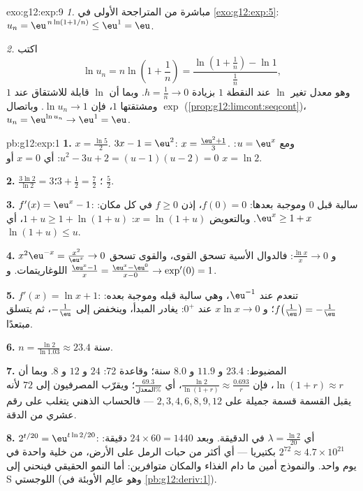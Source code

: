 \begin{solution}{exo:g12:exp:9}
\emph{1.} مباشرة من المتراجحة الأولى في \cref{exo:g12:exp:5}:
$u_n = \eu^{\,n\ln(1+1/n)} \leq \eu^1 = \eu$.

\emph{2.} اكتب
\[
\ln u_n = n \ln\!\left(1 + \frac1n\right)
= \frac{\ln\!\left(1 + \frac1n\right) - \ln 1}{\frac1n},
\]
وهو معدل تغير  $\ln$ عند النقطة $1$ بزيادة
$h = \frac1n \to 0$. وبما أن $\ln$ قابلة للاشتقاق عند $1$ ومشتقتها
$1$، فإن $\ln u_n \to 1$. وباتصال $\exp$
(\cref{prop:g12:limcont:seqcont})، $u_n = \eu^{\ln u_n} \to \eu^1 = \eu$.
\end{solution}

\begin{solution}{pb:g12:exp:1}
\textbf{1.} $x = \frac{\ln 5}{2}$. \quad
$3x - 1 = \eu^2$: $x = \frac{\eu^2 + 1}{3}$. \quad ومع
$u = \eu^x$: $u^2 - 3u + 2 = (u - 1)(u - 2) = 0$: أي $x = 0$ أو
$x = \ln 2$.

\textbf{2.} $\frac{3\ln 2}{\ln 2} = 3$؛ \quad
$3 + \frac12 = \frac72$؛ \quad $\frac52$.

\textbf{3.} $f'(x) = \eu^x - 1$: سالبة قبل $0$ وموجبة
بعدها:  $f(0) = 0$، إذن $f \geq 0$ في كل مكان:
$\eu^x \geq 1 + x$. وبالتعويض $x = \ln(1 + u)$:
$1 + u \geq 1 + \ln(1 + u)$، أي $\ln(1 + u) \leq u$.

\textbf{4.} $x^2\eu^{-x} = \frac{x^2}{\eu^x} \to 0$ و
$\frac{\ln x}{x} \to 0$: فالدوال الأسية تسحق القوى، والقوى
تسحق اللوغاريتمات. و $\frac{\eu^x - 1}{x} =
\frac{\eu^x - \eu^0}{x - 0} \to \exp'(0) = 1$.

\textbf{5.} $f'(x) = \ln x + 1$: تنعدم عند $\eu^{-1}$، وهي سالبة
قبله وموجبة بعده: 
$f\!\left(\frac1\eu\right) = -\frac1\eu$؛ و
$x \ln x \to 0$ عند $0^+$:  يغادر المبدأ، وينخفض إلى
$-\frac1\eu$، ثم يتسلق مبتعدًا.

\textbf{6.} $n = \frac{\ln 2}{\ln 1.03} \approx 23.4$ سنة.

\textbf{7.} المضبوط: $23.4$ و $11.9$ و $8.0$ سنة؛ وقاعدة 72:
$24$ و $12$ و $8$. وبما أن $\ln(1+r) \approx r$، فإن
$\frac{\ln 2}{\ln(1+r)} \approx \frac{0.693}{r}$، أي
$\frac{69.3}{\text{المعدل}\%}$؛ ويقرّب المصرفيون إلى $72$
لأنه يقبل القسمة قسمة جميلة على $2, 3, 4, 6, 8, 9, 12$ ---
فالحساب الذهني يتغلب على رقم عشري من الدقة.

\textbf{8.} $2^{t/20} = \eu^{t \ln 2 / 20}$:
أي $\lambda = \frac{\ln 2}{20}$ في الدقيقة. وبعد
$24 \times 60 = 1440$ دقيقة: $2^{72} \approx 4.7 \times
10^{21}$ بكتيريا --- أي أكثر من حبات الرمل على الأرض،
من خلية واحدة في يوم واحد. والنموذج أمين ما دام الغذاء
والمكان متوافرين: أما النمو الحقيقي فينحني إلى  S اللوجستي
(وهو  عالِم الأوبئة في \cref{pb:g12:deriv:1}).


\end{solution}
